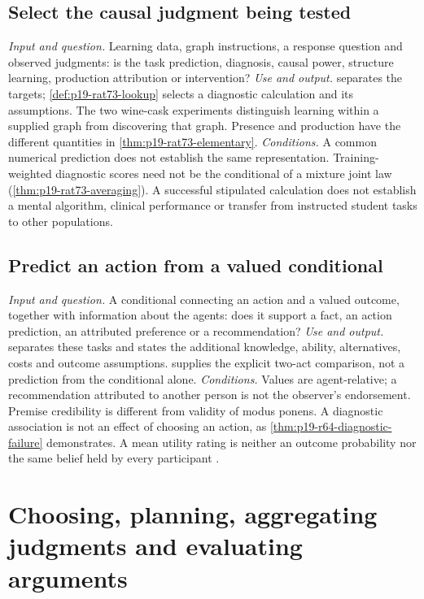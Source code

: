 \subsection{Select the causal judgment being tested}
\label{sec:p14-finder-causal-cognition}
\textit{Input and question.} Learning data, graph instructions, a response
question and observed judgments: is the task prediction, diagnosis,
causal power, structure learning, production attribution or intervention?
\textit{Use and output.}  separates
the targets; \cref{def:p19-rat73-lookup} selects a diagnostic calculation
and its assumptions. The two wine-cask experiments distinguish learning
within a supplied graph from discovering that graph. Presence and
production have the different quantities in
\cref{thm:p19-rat73-elementary}.
\textit{Conditions.} A common numerical prediction does not establish
the same representation. Training-weighted diagnostic scores need not
be the conditional of a mixture joint law
(\cref{thm:p19-rat73-averaging}). A successful stipulated calculation
does not establish a mental algorithm, clinical performance or transfer
from instructed student tasks to other populations.

\subsection{Predict an action from a valued conditional}
\label{sec:p14-finder-utility-conditionals}
\textit{Input and question.} A conditional connecting an action and a
valued outcome, together with information about the agents: does it support
a fact, an action prediction, an attributed preference or a recommendation?
\textit{Use and output.}  separates these
tasks and states the additional knowledge, ability, alternatives, costs
and outcome assumptions.  supplies the
explicit two-act comparison, not a prediction from the conditional alone.
\textit{Conditions.} Values are agent-relative; a recommendation attributed
to another person is not the observer's endorsement. Premise credibility
is different from validity of modus ponens. A diagnostic association is
not an effect of choosing an action, as
\cref{thm:p19-r64-diagnostic-failure} demonstrates. A mean utility rating
is neither an outcome probability nor the same belief held by every
participant \cite{Bonnefon2021Utility}.

\section{Choosing, planning, aggregating judgments and evaluating arguments}
\label{sec:p14-finder-choosing}

